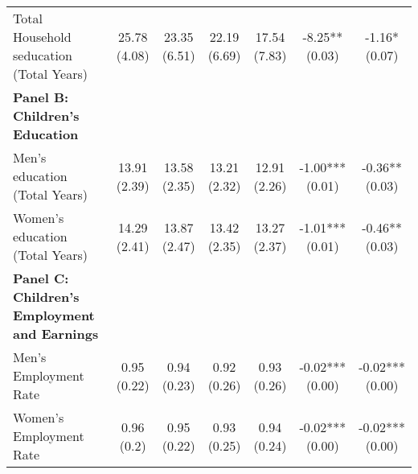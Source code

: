 \begin{table}[H]
{\begin{threeparttable}
\begin{tabular}[t]{lcccccc}
\hspace{1em}Total Household seducation (Total Years) & \specialcell{25.78\\(4.08)} & \specialcell{23.35\\(6.51)} & \specialcell{22.19\\(6.69)} & \specialcell{17.54\\(7.83)} & \specialcell{-8.25**\\(0.03)} & \specialcell{-1.16*\\(0.07)}\\
\textbf{Panel B: Children's Education} & \textbf{} & \textbf{} & \textbf{} & \textbf{} & \textbf{} & \textbf{}\\
\addlinespace
\hspace{1em}Men’s education (Total Years) & \specialcell{13.91\\(2.39)} & \specialcell{13.58\\(2.35)} & \specialcell{13.21\\(2.32)} & \specialcell{12.91\\(2.26)} & \specialcell{-1.00***\\(0.01)} & \specialcell{-0.36**\\(0.03)}\\
\hspace{1em}Women’s education (Total Years) & \specialcell{14.29\\(2.41)} & \specialcell{13.87\\(2.47)} & \specialcell{13.42\\(2.35)} & \specialcell{13.27\\(2.37)} & \specialcell{-1.01***\\(0.01)} & \specialcell{-0.46**\\(0.03)}\\
\textbf{Panel C: Children's Employment and Earnings} & \textbf{} & \textbf{} & \textbf{} & \textbf{} & \textbf{} & \textbf{}\\
\hspace{1em}Men’s Employment Rate & \specialcell{0.95\\(0.22)} & \specialcell{0.94\\(0.23)} & \specialcell{0.92\\(0.26)} & \specialcell{0.93\\(0.26)} & \specialcell{-0.02***\\(0.00)} & \specialcell{-0.02***\\(0.00)}\\
\hspace{1em}Women’s Employment Rate & \specialcell{0.96\\(0.2)} & \specialcell{0.95\\(0.22)} & \specialcell{0.93\\(0.25)} & \specialcell{0.94\\(0.24)} & \specialcell{-0.02***\\(0.00)} & \specialcell{-0.02***\\(0.00)}\\

\end{tabular}
\end{threeparttable}}
\end{table}
